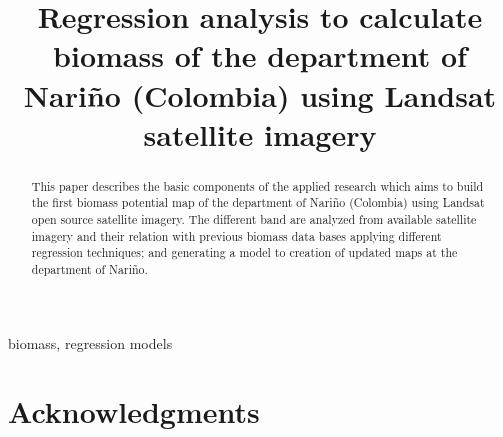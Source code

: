 \documentclass[conference]{IEEEtran}
\begin{document}
\pagestyle{empty}  


\title{Regression analysis to calculate biomass of the department of Nariño (Colombia) using Landsat satellite imagery }

\author{
\and
{}
}

\maketitle

\begin{abstract}

This paper describes the basic components of the applied research which aims to build the first biomass potential map of the department of Nariño (Colombia) using Landsat open source satellite imagery. The different band are analyzed from available satellite imagery and their relation with previous biomass data bases applying different regression techniques; and generating a model to creation of updated maps at the department of Nariño.

\end{abstract}
 


\begin{IEEEkeywords}
biomass, regression models 
\end{IEEEkeywords}

\thispagestyle{empty} 

\IEEEpeerreviewmaketitle










\ifCLASSOPTIONcompsoc
  \section*{Acknowledgments}
\else
\end{document}
